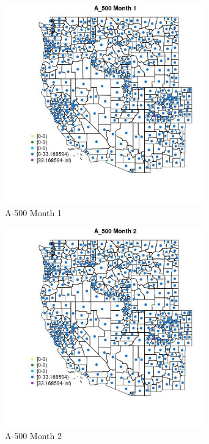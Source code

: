 \begin{figure} 
\centering  
\includegraphics[width=0.77\textwidth]{Code_Outputs/df_report_ML_predictors_CountyCentroid_Locations_Dates_2008-01-01to2018-12-31_MapObsMo1A_500.jpg} 
\caption{\label{fig:df_report_ML_predictors_CountyCentroid_Locations_Dates_2008-01-01to2018-12-31MapObsMo1A_500}A-500 Month 1} 
\end{figure} 
 

\begin{figure} 
\centering  
\includegraphics[width=0.77\textwidth]{Code_Outputs/df_report_ML_predictors_CountyCentroid_Locations_Dates_2008-01-01to2018-12-31_MapObsMo2A_500.jpg} 
\caption{\label{fig:df_report_ML_predictors_CountyCentroid_Locations_Dates_2008-01-01to2018-12-31MapObsMo2A_500}A-500 Month 2} 
\end{figure} 
 

